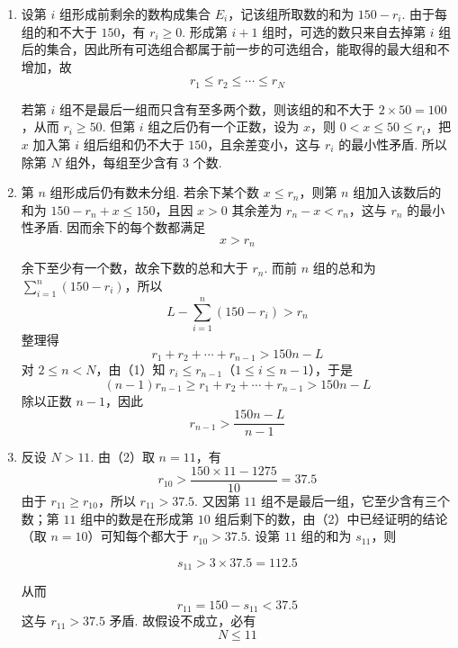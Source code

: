\begin{solution}
\begin{enumerate}
\item 设第 \(i\) 组形成前剩余的数构成集合 \(E_i\)，记该组所取数的和为
\(150-r_i\). 由于每组的和不大于 \(150\)，有 \(r_i\geqslant0\). 形成第 \(i+1\) 组时，可选的数只来自去掉第 \(i\) 组后的集合，因此所有可选组合都属于前一步的可选组合，能取得的最大组和不增加，故
\[
r_{1}\leqslant r_{2}\leqslant\cdots\leqslant r_{N}
\]

若第 \(i\) 组不是最后一组而只含有至多两个数，则该组的和不大于
\(2\times50=100\)，从而 \(r_i\geqslant50\). 但第 \(i\) 组之后仍有一个正数，设为 \(x\)，则
\(0<x\leqslant50\leqslant r_i\)，把 \(x\) 加入第 \(i\) 组后组和仍不大于 \(150\)，且余差变小，这与 \(r_i\) 的最小性矛盾. 所以除第 \(N\) 组外，每组至少含有 \(3\) 个数.
\item 第 \(n\) 组形成后仍有数未分组. 若余下某个数 \(x\leqslant r_n\)，则第 \(n\) 组加入该数后的和为 \(150-r_n+x\leqslant150\)，且因 \(x>0\) 其余差为 \(r_n-x<r_n\)，这与 \(r_n\) 的最小性矛盾. 因而余下的每个数都满足
\[
x>r_n
\]

余下至少有一个数，故余下数的总和大于 \(r_n\). 而前 \(n\) 组的总和为
\(\sum_{i=1}^{n}(150-r_i)\)，所以
\[
L-\sum_{i=1}^{n}(150-r_i)>r_n
\]
整理得
\[
r_1+r_2+\cdots+r_{n-1}>150n-L
\]
对 \(2\leqslant n<N\)，由（1）知
\(r_i\leqslant r_{n-1}\)（\(1\leqslant i\leqslant n-1\)），于是
\[
(n-1)r_{n-1}\geqslant r_1+r_2+\cdots+r_{n-1}>150n-L
\]
除以正数 \(n-1\)，因此
\[
r_{n-1}>\frac{150n-L}{n-1}
\]

\item 反设 \(N>11\). 由（2）取 \(n=11\)，有
\[
r_{10}>\frac{150\times11-1275}{10}=37.5
\]
由于 \(r_{11}\geqslant r_{10}\)，所以 \(r_{11}>37.5\). 又因第 \(11\) 组不是最后一组，它至少含有三个数；第 \(11\) 组中的数是在形成第 \(10\) 组后剩下的数，由（2）中已经证明的结论（取 \(n=10\)）可知每个都大于 \(r_{10}>37.5\). 设第 \(11\) 组的和为 \(s_{11}\)，则

\[
s_{11}>3\times37.5=112.5
\]

从而
\[
r_{11}=150-s_{11}<37.5
\]
这与 \(r_{11}>37.5\) 矛盾. 故假设不成立，必有
\[
N\leqslant11
\]
\end{enumerate}
\end{solution}
